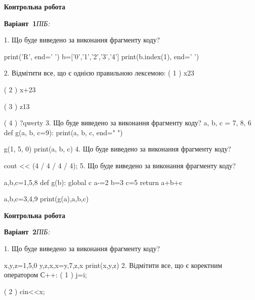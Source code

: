 \documentclass[11pt]{article}
\begin{document}
{\large\textbf{Контрольна робота}}

\textbf{Варіант \No\,1}\hfill \textit{ПІБ:}\,\underline{\hspace{60mm}}
\vspace{4mm}

1. Що буде виведено за виконання фрагменту коду?

print('R', end=' ')
b=['0','1','2','3','4']
print(b.index(1), end=' ')

\vspace{5mm}
2. %
Відмітити все, що є однією правильною лексемою:
( 1 ) x23

( 2 ) x+23

( 3 ) z13

( 4 ) ?qwerty
\vspace{5mm}
3. Що буде виведено за виконання фрагменту коду?
a, b, c = 7, 8, 6
def g(a, b, c=9):
    print(a, b, c, end=" ")

g(1, 5, 0)
print(a, b, c)
\vspace{5mm}
4. Що буде виведено за виконання фрагменту коду?

cout << (4 / 4 / 4 / 4);
\vspace{5mm}
5. Що буде виведено за виконання фрагменту коду?

a,b,c=1,5,8
def g(b):
global c    a-=2
    b=3
    c=5
    return a+b+c

a,b,c=3,4,9
print(g(a),a,b,c)
\vspace{5mm}





\newpage

\newpage

{\large\textbf{Контрольна робота}}

\textbf{Варіант \No\,2}\hfill \textit{ПІБ:}\,\underline{\hspace{60mm}}
\vspace{4mm}

1. Що буде виведено за виконання фрагменту коду?

x,y,z=1,5,0
y,z,x,x=y,7,z,x
print(x,y,z)
\vspace{5mm}
2. %
Відмітити все, що є коректним оператором С++:
( 1 ) j=i;

( 2 ) cin<<x;
\end{document}
